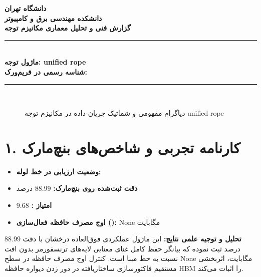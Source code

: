 \documentclass[12pt,a4paper]{article}
\begin{document}
\begin{center}
{\Large\bfseries دانشگاه تهران}\\[0.2cm]
{\large\bfseries دانشکده مهندسی برق و کامپیوتر}\\[0.2cm]
{\large\bfseries گزارش فنی و تحلیل معماری مکانیزم توجه}\\[0.5cm]
\rule{\linewidth}{1pt}\\[0.3cm]
{\LARGE\bfseries ماژول توجه: unified rope}\\[0.2cm]
{\large \textbf{شناسه رسمی در فریم‌ورک:} }\\[0.2cm]
\rule{\linewidth}{1pt}\\[0.5cm]
\end{center}

\begin{figure}[H]
\centering
{}
\caption{دیاگرام مفهومی و شماتیک جریان داده در مکانیزم توجه unified rope}
\end{figure}

\section*{۱. کارنامه تجربی و شاخص‌های بنچ‌مارک}
\begin{itemize}
\item \textbf{وضعیت ارزیابی در خط لوله:} 
\item \textbf{دقت ثبت‌شده روی بنچ‌مارک:} 88.99 درصد
\item \textbf{امتیاز :} 9.68
\item \textbf{اوج مصرف حافظه فعال‌سازی ():} None مگابایت
\end{itemize}
\textbf{تحلیل و توجیه علمی نتایج:} این ماژول عملکردی فوق‌العاده درخشان با دقت 88.99 درصد ثبت نموده که بیانگر حفظ کامل غنای معنایی لایه‌های ترنسفورمر بدون افت نسبت به خط مبنا است. کنترل اوج مصرف حافظه در سطح None مگابایت، اثربخشی مستقیم فاکتورسازی ساختاریافته در دور زدن دیواره حافظه HBM را اثبات می‌کند.
\end{document}
